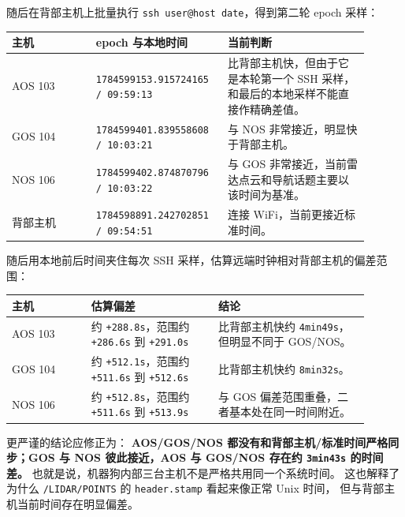 \documentclass[UTF8,11pt,a4paper]{ctexart}
\begin{document}
随后在背部主机上批量执行 \texttt{ssh user@host date}，得到第二轮 epoch 采样：

\begin{center}
\renewcommand{\arraystretch}{1.18}
\begin{tabular}{p{0.22\linewidth}p{0.31\linewidth}p{0.37\linewidth}}
\toprule
\textbf{主机} & \textbf{epoch 与本地时间} & \textbf{当前判断}\\
\midrule
AOS 103 & \texttt{1784599153.915724165 / 09:59:13} & 比背部主机快，但由于它是本轮第一个 SSH 采样，和最后的本地采样不能直接作精确差值。\\
GOS 104 & \texttt{1784599401.839558608 / 10:03:21} & 与 NOS 非常接近，明显快于背部主机。\\
NOS 106 & \texttt{1784599402.874870796 / 10:03:22} & 与 GOS 非常接近，当前雷达点云和导航话题主要以该时间为基准。\\
背部主机 & \texttt{1784598891.242702851 / 09:54:51} & 连接 WiFi，当前更接近标准时间。\\
\bottomrule
\end{tabular}
\end{center}

随后用本地前后时间夹住每次 SSH 采样，估算远端时钟相对背部主机的偏差范围：

\begin{center}
\renewcommand{\arraystretch}{1.18}
\begin{tabular}{p{0.20\linewidth}p{0.32\linewidth}p{0.38\linewidth}}
\toprule
\textbf{主机} & \textbf{估算偏差} & \textbf{结论}\\
\midrule
AOS 103 & 约 \texttt{+288.8s}，范围约 \texttt{+286.6s} 到 \texttt{+291.0s} & 比背部主机快约 \texttt{4min49s}，但明显不同于 GOS/NOS。\\
GOS 104 & 约 \texttt{+512.1s}，范围约 \texttt{+511.6s} 到 \texttt{+512.6s} & 比背部主机快约 \texttt{8min32s}。\\
NOS 106 & 约 \texttt{+512.8s}，范围约 \texttt{+511.6s} 到 \texttt{+513.9s} & 与 GOS 偏差范围重叠，二者基本处在同一时间附近。\\
\bottomrule
\end{tabular}
\end{center}

更严谨的结论应修正为：
\textbf{AOS/GOS/NOS 都没有和背部主机/标准时间严格同步；GOS 与 NOS 彼此接近，AOS 与 GOS/NOS 存在约 \texttt{3min43s} 的时间差。}
也就是说，机器狗内部三台主机不是严格共用同一个系统时间。
这也解释了为什么 \texttt{/LIDAR/POINTS} 的 \texttt{header.stamp} 看起来像正常 Unix 时间，
但与背部主机当前时间存在明显偏差。
\end{document}

